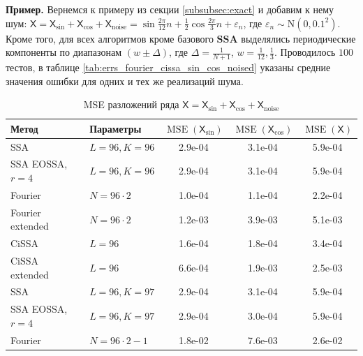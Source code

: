 \documentclass[a4paper, 11pt]{article}
\newcommand{\SSA}{\textbf{SSA}}
\newcommand{\TS}{\mathsf{X}}
\begin{document}
\textbf{\large{Пример.}} Вернемся к примеру из секции \ref{subsubsec:exact} и добавим к нему шум: $\TS = \TS_{\sin} + \TS_{\cos} + \TS_{\mathrm{noise}} = \sin{\frac{2\pi}{12}n} + \frac{1}{2}\cos{\frac{2\pi}{3}n} + \varepsilon_n$, где $\varepsilon_n \sim \mathrm N(0, 0.1^2)$.
Кроме того, для всех алгоритмов кроме базового $\SSA$ выделялись периодические компоненты по диапазонам $\left(w \pm \Delta \right)$, где $\Delta = \frac{1}{N+1}$, $w = \frac{1}{12}, \frac{1}{3}$.
Проводилось $100$ тестов, в таблице \ref{tab:errs_fourier_cissa_sin_cos_noised} указаны средние значения ошибки для одних и тех же реализаций шума.
\begin{table}[H]
	\caption{MSE разложений ряда $\TS = \TS_{\sin} + \TS_{\cos} +\TS_{\mathrm{noise}}$ }
	\centering
	\begin{tabular}{l|l|ccc}
		\hline
		Метод              & Параметры            & $\operatorname{MSE}(\TS_{\sin})$ & $\operatorname{MSE}(\TS_{\cos})$ & $\operatorname{MSE}(\TS)$ \\
		\hline
		SSA                & $L = 96, K = 96 $    & 2.9e-04                          & 3.1e-04                          & 5.9e-04                   \\
		SSA EOSSA, $r = 4$ & $L = 96, K = 96 $    & 2.9e-04                          & 3.1e-04                          & 5.9e-04                   \\
		Fourier            & $N = 96 \cdot 2$     & 1.0e-04                          & 1.1e-04                          & 2.2e-04                   \\
		Fourier extended   & $N = 96 \cdot 2$     & 1.2e-03                          & 3.9e-03                          & 5.1e-03                   \\
		CiSSA              & $L = 96$             & 1.6e-04                          & 1.8e-04                          & 3.4e-04                   \\
		CiSSA extended     & $L = 96$             & 6.6e-04                          & 1.9e-03                          & 2.5e-03                   \\
		\hline
		SSA                & $L = 96, K = 97 $    & 2.9e-04                          & 3.1e-04                          & 5.9e-04                   \\
		SSA EOSSA, $r = 4$ & $L = 96, K = 97 $    & 2.9e-04                          & 3.0e-04                          & 5.9e-04                   \\
		Fourier            & $N = 96 \cdot 2 - 1$ & 1.8e-02                          & 7.6e-03                          & 2.6e-02                   \\

\end{tabular}
\end{table}
\end{document}
